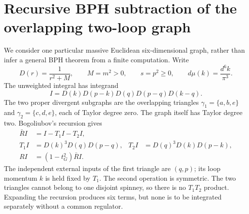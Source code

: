\section{Recursive BPH subtraction of the overlapping two-loop graph}
We consider one particular massive Euclidean six-dimensional graph, rather
than infer a general BPH theorem from a finite computation. Write
\[
 D(r)=\frac1{r^2+M},\qquad M=m^2>0,\qquad s=p^2\geq0,
 \qquad d\mu(k)=\frac{d^6k}{\pi^3}.
\]
The unweighted integral has integrand
\[
 I=D(k)D(p-k)D(q)D(p-q)D(k-q).
\]
The two proper divergent subgraphs are the overlapping triangles
\(\gamma_1=\{a,b,e\}\) and \(\gamma_2=\{c,d,e\}\), each of Taylor degree zero.
The graph itself has Taylor degree two. Bogoliubov's recursion gives
\begin{align}
 \bar R I&=I-T_1I-T_2I,\\
 T_1I&=D(k)^3D(q)D(p-q),&
 T_2I&=D(q)^3D(k)D(p-k),\\
 RI&=(1-t_G^2)\bar R I.
\end{align}
The independent external inputs of the first triangle are \((q,p)\); its
loop momentum \(k\) is held fixed by \(T_1\). The second operation is symmetric.
The two triangles cannot belong to one disjoint spinney, so there is no
\(T_1T_2\) product. Expanding the recursion produces six terms, but none is
to be integrated separately without a common regulator.

